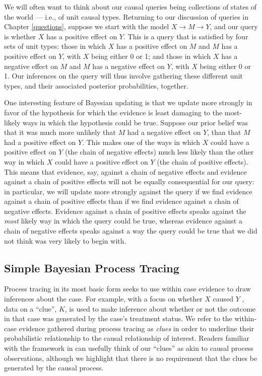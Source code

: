 \documentclass[
  12pt,
]{book}
\begin{document}
We will often want to think about our causal queries being collections of states of the world --- i.e., of unit causal types. Returning to our discussion of queries in Chapter \ref{questions}, suppose we start with the model \(X \rightarrow M \rightarrow Y\), and our query is whether \(X\) has a positive effect on \(Y\). This is a query that is satisfied by four sets of unit types: those in which \(X\) has a positive effect on \(M\) and \(M\) has a positive effect on \(Y\), with \(X\) being either 0 or 1; and those in which \(X\) has a negative effect on \(M\) and \(M\) has a negative effect on \(Y\), with \(X\) being either 0 or 1. Our inferences on the query will thus involve gathering these different unit types, and their associated posterior probabilities, together.

One interesting feature of Bayesian updating is that we update more strongly in favor of the hypothesis for which the evidence is least damaging to the most-likely ways in which the hypothesis could be true. Suppose our prior belief was that it was much more unlikely that \(M\) had a negative effect on \(Y\), than that \(M\) had a positive effect on \(Y\). This makes one of the ways in which \(X\) could have a positive effect on \(Y\) (the chain of negative effects) much less likely than the other way in which \(X\) could have a positive effect on \(Y\) (the chain of positive effects). This means that evidence, say, against a chain of negative effects and evidence against a chain of positive effects will not be equally consequential for our query: in particular, we will update more strongly against the query if we find evidence against a chain of positive effects than if we find evidence against a chain of negative effects. Evidence against a chain of positive effects speaks against the \emph{most} likely way in which the query could be true, whereas evidence against a chain of negative effects speaks against a way the query could be true that we did not think was very likely to begin with.

\hypertarget{simple-bayesian-process-tracing}{%
\subsection{Simple Bayesian Process Tracing}\label{simple-bayesian-process-tracing}}

Process tracing in its most basic form seeks to use within case evidence to draw inferences about the case. For example, with a focus on whether \(X\) caused \(Y\) , data on a ``clue'', \(K\), is used to make inference about whether or not the outcome in that case was generated by the case's treatment status. We refer to the within-case evidence gathered during process tracing as \emph{clues} in order to underline their probabilistic relationship to the causal relationship of interest. Readers familiar with the framework in \citet{collier2004sources} can usefully think of our ``clues'' as akin to causal process observations, although we highlight that there is no requirement that the clues be generated by the causal process.
\end{document}
